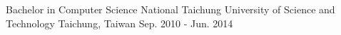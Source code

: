 

\begin{cventries}

  \cventry
    {Bachelor in Computer Science} %
    {National Taichung University of Science and Technology} %
    {Taichung, Taiwan} %
    {Sep. 2010 - Jun. 2014} %
    {
      \begin{cvitems} %
      \end{cvitems}
    }

\end{cventries}
